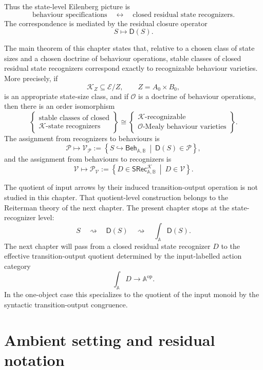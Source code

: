 Thus the state-level Eilenberg picture is
\[
\text{behaviour specifications}
\quad\longleftrightarrow\quad
\text{closed residual state recognizers}.
\]
The correspondence is mediated by the residual closure operator
\[
S\longmapsto \mathsf D(S).
\]

The main theorem of this chapter states that, relative to a chosen class of
state sizes and a chosen doctrine of behaviour operations, stable classes of
closed residual state recognizers correspond exactly to recognizable
behaviour varieties. More precisely, if
\[
\mathcal K_Z\subseteq \mathcal E/Z,
\qquad
Z=A_0\times B_0,
\]
is an appropriate state-size class, and if \(\mathcal O\) is a doctrine of
behaviour operations, then there is an order isomorphism
\[
\left\{
\begin{array}{c}
\text{stable classes of closed}\\
\mathcal K\text{-state recognizers}
\end{array}
\right\}
\cong
\left\{
\begin{array}{c}
\mathcal K\text{-recognizable}\\
\mathcal O\text{-Mealy behaviour varieties}
\end{array}
\right\}.
\]
The assignment from recognizers to behaviours is
\[
\mathcal P
\longmapsto
\mathcal V_{\mathcal P}
:=
\left\{
S\hookrightarrow\mathsf{Beh}_{\mathbb A,\mathbb B}
\ \middle|\
\mathsf D(S)\in\mathcal P
\right\},
\]
and the assignment from behaviours to recognizers is
\[
\mathcal V
\longmapsto
\mathcal P_{\mathcal V}
:=
\left\{
D\in\mathsf{SRec}^{\mathcal K}_{\mathbb A,\mathbb B}
\ \middle|\
D\in\mathcal V
\right\}.
\]

The quotient of input arrows by their induced transition-output operation is
not studied in this chapter. That quotient-level construction belongs to the
Reiterman theory of the next chapter. The present chapter stops at the
state-recognizer level:
\[
S
\quad\rightsquigarrow\quad
\mathsf D(S)
\quad\rightsquigarrow\quad
\int_{\mathbb A}\mathsf D(S).
\]
The next chapter will pass from a closed residual state recognizer \(D\) to
the effective transition-output quotient determined by the input-labelled
action category
\[
\int_{\mathbb A}D\longrightarrow \mathbb A^{\mathrm{op}}.
\]
In the one-object case this specializes to the quotient of the input monoid
by the syntactic transition-output congruence.

\section{Ambient setting and residual notation}
\label{sec:state-eilenberg-ambient-setting}

